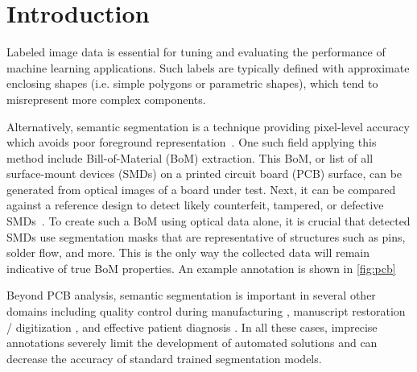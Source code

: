 \section{Introduction}
Labeled image data is essential for tuning and evaluating the performance of machine learning applications.
Such labels are typically defined with approximate enclosing shapes (i.e. simple polygons or parametric shapes), which tend to misrepresent more complex components.

Alternatively, semantic segmentation is a technique providing pixel-level accuracy which avoids poor foreground representation~\cite{chengSurveyAnalysisAutomatic2018}.
One such field applying this method include Bill-of-Material (BoM) extraction. This BoM, or list of all surface-mount devices (SMDs) on a printed circuit board (PCB) surface, can be generated from optical images of a board under test. Next, it can be compared against a reference design to detect likely counterfeit, tampered, or defective SMDs~\cite{paradis2020color,azhaganReviewAutomaticBill2019}. To create such a BoM using optical data alone, it is crucial that detected SMDs use segmentation masks that are representative of structures such as pins, solder flow, and more. This is the only way the collected data will remain indicative of true BoM properties. An example annotation is shown in \autoref{fig:pcb}

\makePcbFig

Beyond PCB analysis, semantic segmentation is important in several other domains including quality control during manufacturing \cite{fergusonDetectionSegmentationManufacturing2018,anagnostopoulosComputerVisionApproach2001,anagnostopoulosHighPerformanceComputing2002}, manuscript restoration / digitization \cite{gatosSegmentationfreeRecognitionTechnique2004,kesimanNewSchemeText2016,jainTextSegmentationUsing1992,taxtSegmentationDocumentImages1989,fujisawaSegmentationMethodsCharacter1992}, and effective patient diagnosis \cite{seifertSemanticAnnotationMedical2010,rajchlDeepCutObjectSegmentation2017,yushkevichUserguided3DActive2006,iakovidisRatsnakeVersatileImage2014}.
In all these cases, imprecise annotations severely limit the development of automated solutions and can decrease the accuracy of standard trained segmentation models.

